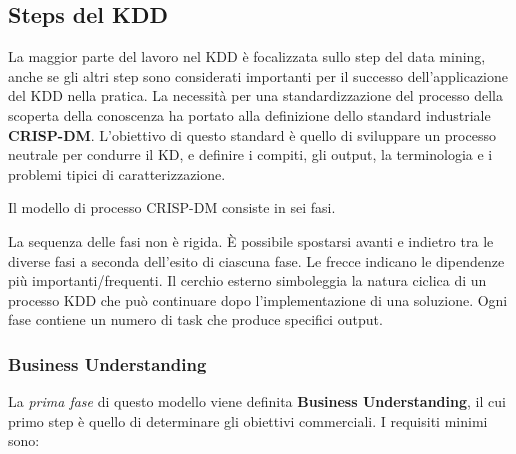 \documentclass[a4paper]{extarticle}
\begin{document}
\newpage
\subsection{Steps del KDD}

La maggior parte del lavoro nel KDD è focalizzata sullo step del data mining, anche se gli altri step sono considerati importanti per il successo dell'applicazione del KDD nella pratica. La necessità per una standardizzazione del processo della scoperta della conoscenza ha portato alla definizione dello standard industriale \textbf{CRISP-DM}. L'obiettivo di questo standard è quello di sviluppare un processo neutrale per condurre il KD,  e definire i compiti, gli output, la terminologia e i problemi tipici di caratterizzazione. 

Il modello di processo CRISP-DM consiste in sei fasi.

\begin{center}


\end{center}

La sequenza delle fasi non è rigida. È possibile spostarsi avanti e indietro tra le diverse fasi a seconda dell'esito di ciascuna fase. Le frecce indicano le dipendenze più importanti/frequenti. Il cerchio esterno simboleggia la natura ciclica di un processo KDD che può continuare dopo l'implementazione di una soluzione. Ogni fase contiene un numero di task che produce specifici output.

\subsubsection{Business Understanding}

La \textit{prima fase} di questo modello viene definita \textbf{Business Understanding}, il cui primo step è quello di determinare gli obiettivi commerciali. I requisiti minimi sono:
\end{document}

